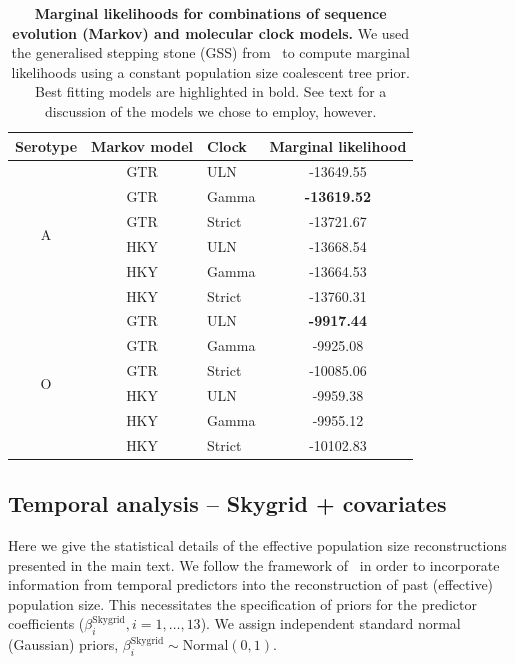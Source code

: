 \documentclass[a4paper,10pt]{article}
\begin{document}
\begin{table}[!ht]
\caption{\textbf{Marginal likelihoods for combinations of sequence evolution (Markov) and molecular clock models.}
We used the generalised stepping stone (GSS) from~\cite{M-Baele2015} to compute marginal likelihoods using a constant population size coalescent tree prior.
Best fitting models are highlighted in bold.
See text for a discussion of the models we chose to employ, however.
}
\begin{center}
 \begin{tabular}{cclc}
\hline
Serotype & Markov model & Clock & Marginal likelihood \\
\hline
\multirow{6}{*}{A} & GTR & ULN & -13649.55 \\
 & GTR & Gamma & \textbf{-13619.52} \\
 & GTR & Strict & -13721.67 \\
 & HKY & ULN & -13668.54 \\
 & HKY & Gamma & -13664.53 \\
 & HKY & Strict & -13760.31 \\
 \hline
\multirow{6}{*}{O}& GTR & \multicolumn{1}{l}{ULN} & \textbf{-9917.44} \\
\multicolumn{1}{l}{} & GTR & \multicolumn{1}{l}{Gamma} & -9925.08 \\
\multicolumn{1}{l}{} & GTR & \multicolumn{1}{l}{Strict} & -10085.06 \\
\multicolumn{1}{l}{} & HKY & \multicolumn{1}{l}{ULN} & -9959.38 \\
\multicolumn{1}{l}{} & HKY & \multicolumn{1}{l}{Gamma} & -9955.12 \\
\multicolumn{1}{l}{} & HKY & \multicolumn{1}{l}{Strict} & -10102.83\\
\hline
\end{tabular}
\end{center}
\label{stab:treeclockselection}
\end{table}

\subsection*{Temporal analysis -- Skygrid + covariates}

Here we give the statistical details of the effective population size reconstructions presented in the main text.
We follow the framework of~\cite{M-Gill2016} in order to incorporate information from temporal predictors into the reconstruction of past (effective) population size.
This necessitates the specification of priors for the predictor coefficients ($\beta^{\text{Skygrid}}_i, i = 1, \ldots, 13$).
We assign independent standard normal (Gaussian) priors, $\beta^{\text{Skygrid}}_i \sim \text{Normal}(0, 1)$.
\end{document}
